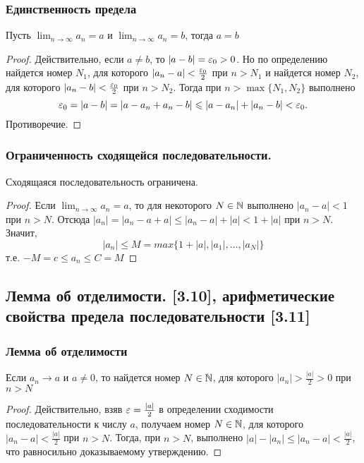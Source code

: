 \documentclass[12pt, a4paper]{article}
\begin{document}
    \subsubsection{Единственность предела}
    Пусть $\lim_{n \to \infty} a_n = a$ и $\lim_{n \to \infty} a_n = b$, тогда $a = b$
    \begin{proof}
    Действительно, если $a \ne b$, то $|a - b| = \varepsilon_0 > 0$. Но по определению найдется номер $N_1$, для которого $|a_n - a| < \frac{\varepsilon_0}{2}$ при $n > N_1$ и найдется номер $N_2$, для которого $|a_n - b| < \frac{\varepsilon_0}{2}$ при $n > N_2$. Тогда при $n > \max \{N_1, N_2\}$ выполнено
    \begin{equation*}
        \varepsilon_0 = |a - b| = |a - a_n + a_n - b| \leqslant |a - a_n| + |a_n - b| < \varepsilon_0.
    \end{equation*}
    Противоречие.
    \end{proof}
    \subsubsection{Ограниченность сходящейся последовательности.}
    Сходящаяся последовательность ограничена.
    \begin{proof}
    Если $\lim_{n \to \infty} a_n = a$, то для некоторого $N \in \mathbb{N}$ выполнено $|a_n - a| < 1$ при $n > N$. Отсюда $|a_n| = |a_n - a + a| \leq |a_n - a| + |a| < 1 + |a|$ при $n > N$. Значит,
    \begin{equation*}
        |a_n| \leq M = max \{1 + |a|, |a_1|, \dots , |a_{N}|\}
    \end{equation*}
    т.е. $-M = c \leq a_n \leq C = M$
    \end{proof}
    \subsection{Лемма об отделимости. [3.10], арифметические свойства предела последовательности [3.11]}
    \subsubsection{Лемма об отделимости}
    Если $a_n \to a$ и $a \ne 0$, то найдется номер $N \in \mathbb{N}$, для которого $|a_n| > \frac{|a|}{2} > 0$ при $n > N$

    \begin{proof} Действительно, взяв $\varepsilon = \frac{|a|}{2}$ в определении сходимости последовательности к числу $a$, получаем номер $N \in \mathbb{N}$, для которого $|a_n - a| < \frac{|a|}{2}$ при $n > N$. Тогда, при $n > N$, выполнено $|a| - |a_n| \leq |a_n - a| < \frac{|a|}{2}$, что равносильно доказываемому утверждению. \end{proof}
\end{document}
